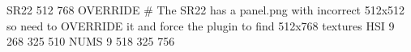 SR22 512 768 OVERRIDE
# The SR22 has a panel.png with incorrect 512x512 so need to OVERRIDE it and force the plugin to find 512x768 textures
HSI    9 268 325 510
NUMS   9 518 325 756
